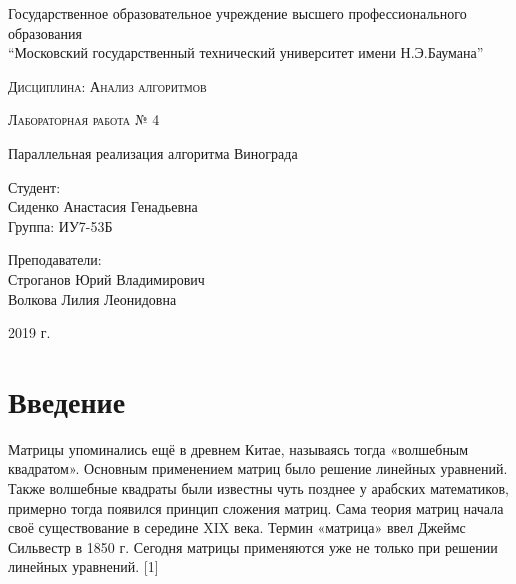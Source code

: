 \documentclass[a4paper,14pt]{article} %
\newcommand{\anonsection}[1]{\section*{#1}\addcontentsline{toc}{section}{#1}}
\begin{document}
	\begin{titlepage}

       		\begin{center}
         		\large
		
        			Государственное образовательное учреждение высшего профессионального образования\\
       			“Московский государственный технический университет имени Н.Э.Баумана”
         		\vspace{3cm}
            
            		\textsc{Дисциплина: Анализ алгоритмов}
           		\vspace{0.5cm}
                
            		\textsc{Лабораторная работа № 4}
           		 \vspace{3cm}
            
           		 \LARGE 
		 
		 	Параллельная реализация алгоритма Винограда
           		 \vspace{3cm}
            
            		\begin{flushright}
            			Студент: \\
				Сиденко Анастасия Генадьевна \\   
            			Группа: ИУ7-53Б \\
           			\hfill
            
           			Преподаватели: \\
				Строганов Юрий Владимирович \\
           			Волкова Лилия Леонидовна
            			\vfill
            		\end{flushright}
		
			\large
            		2019 г.
		\end{center}

	\end{titlepage}
    
	\tableofcontents
	
	\newpage
    
	\anonsection{Введение}
	\hfill
	
	Матрицы упоминались ещё в древнем Китае, называясь тогда «волшебным квадратом». Основным применением матриц было решение линейных уравнений. Также волшебные квадраты были известны чуть позднее у арабских математиков, примерно тогда появился принцип сложения матриц. Сама теория матриц начала своё существование в середине XIX века. Термин «матрица» ввел Джеймс Сильвестр в 1850 г. Сегодня матрицы применяются уже не только при решении линейных уравнений. [1]
	
\end{document}
